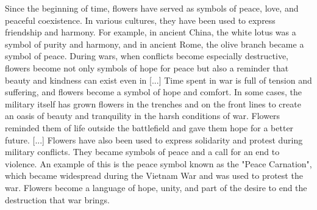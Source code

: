 \documentclass[12pt]{article}
\begin{document}
Since the beginning of time, flowers have served as symbols of peace, love, and peaceful coexistence. In various cultures, they have been used to express friendship and harmony. For example, in ancient China, the white lotus was a symbol of purity and harmony, and in ancient Rome, the olive branch became a symbol of peace. During wars, when conflicts become especially destructive, flowers become not only symbols of hope for peace but also a reminder that beauty and kindness can exist even in [...] Time spent in war is full of tension and suffering, and flowers become a symbol of hope and comfort. In some cases, the military itself has grown flowers in the trenches and on the front lines to create an oasis of beauty and tranquility in the harsh conditions of war. Flowers reminded them of life outside the battlefield and gave them hope for a better future. [...] Flowers have also been used to express solidarity and protest during military conflicts. They became symbols of peace and a call for an end to violence. An example of this is the peace symbol known as the "Peace Carnation", which became widespread during the Vietnam War and was used to protest the war. Flowers become a language of hope, unity, and part of the desire to end the destruction that war brings.
\end{document}

